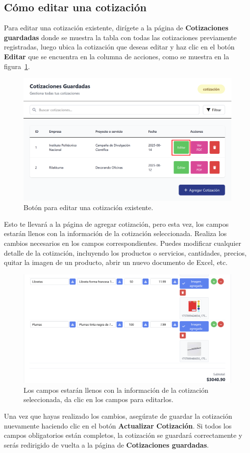 \documentclass{Pretexto/bluereport}
\begin{document}
\begin{minipage}
\subsection{Cómo editar una cotización}
Para editar una cotización existente, dirígete a la página de \textbf{Cotizaciones guardadas} donde se muestra la tabla con todas las cotizaciones previamente registradas, luego
    ubica la cotización que deseas editar y haz clic en el botón \textbf{Editar} que se encuentra en la columna de acciones, como se muestra en la figura~\ref{fig:editar_cotizacion}.
\begin{figure}[H]
    \centering
        \includegraphics[width=0.8\linewidth]{img/editar_cotizacion.png}
    \caption{Botón para editar una cotización existente.}
    \label{fig:editar_cotizacion}
\end{figure}
Esto te llevará a la página de agregar cotización, pero esta vez, los campos estarán llenos con la información de la cotización seleccionada.
Realiza los cambios necesarios en los campos correspondientes. Puedes modificar cualquier detalle de la cotización, incluyendo los productos o servicios, cantidades, precios, quitar la imagen
de un producto, abrir un nuevo documento de Excel, etc.
\begin{figure}[H]
    \centering
        \includegraphics[width=0.8\linewidth]{img/editar_producto.png}
    \caption{Los campos estarán llenos con la información de la cotización seleccionada, da clic en los campos para editarlos.}
    \label{fig:editar_producto}
\end{figure}
Una vez que hayas realizado los cambios, asegúrate de guardar la cotización nuevamente haciendo clic en el botón \textbf{Actualizar Cotización}. 
Si todos los campos obligatorios están completos, la cotización se guardará correctamente y serás redirigido de vuelta a la página de \textbf{Cotizaciones guardadas}.

\end{minipage}
\end{document}
